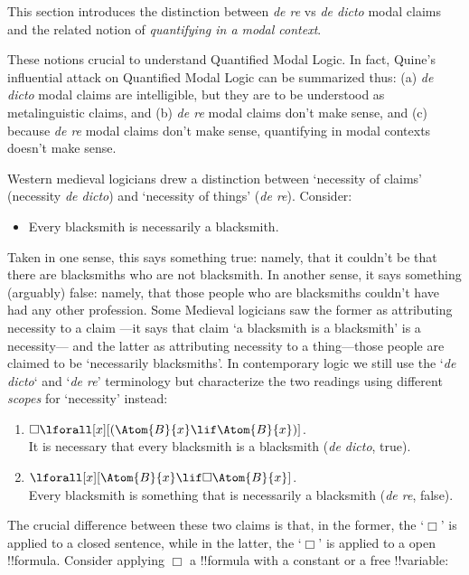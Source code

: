\documentclass[../../../include/open-logic-section]{subfiles}
\begin{document}


This section introduces the distinction between \emph{de re} vs
\emph{de dicto} modal claims and the related notion of 
\emph{quantifying in a modal context}.

These notions crucial to understand Quantified Modal Logic. In fact,
Quine's influential attack on Quantified Modal Logic can be summarized
thus: (a) \emph{de dicto} modal claims are intelligible, but they are
to be understood as metalinguistic claims, and (b) \emph{de re} modal
claims don't make sense, and (c) because \emph{de re} modal claims
don't make sense, quantifying in modal contexts doesn't make sense.

Western medieval logicians drew a distinction between `necessity of
claims' (necessity \emph{de dicto}) and `necessity of things' 
(\emph{de re}). Consider:

\begin{itemize}
\item Every blacksmith is necessarily a blacksmith.
\end{itemize}

Taken in one sense, this says something true: namely, that it couldn't
be that there are blacksmiths who are not blacksmith. In another sense,
it says something (arguably) false: namely, that those people who are
blacksmiths couldn't have had any other profession. Some 
Medieval logicians saw the former as attributing necessity to a claim
---it says that claim `a blacksmith is a blacksmith' is a necessity---
and the latter as attributing necessity to a thing---those people
are claimed to be `necessarily blacksmiths'. In contemporary logic 
we still use the `\emph{de dicto}` and `\emph{de re}' terminology
but characterize the two readings using different \emph{scopes} for 
`necessity' instead:

\begin{enumerate}
\item $\Box\lforall[x][(\Atom{B}{x}\lif\Atom{B}{x})]$.\\ 
It is necessary that every blacksmith is a blacksmith (\emph{de
dicto}, true).
\item $\lforall[x][\Atom{B}{x}\lif\Box\Atom{B}{x}]$.\\
Every blacksmith is something that is necessarily a blacksmith
(\emph{de re}, false).
\end{enumerate}

The crucial difference between these two claims is that, in the former,
the `$\Box$' is applied to a closed sentence, while in the latter,
the `$\Box$' is applied to a open !!{formula}. Consider applying
 $\Box$ a !!{formula} with a constant or a free !!{variable}:
\end{document}
